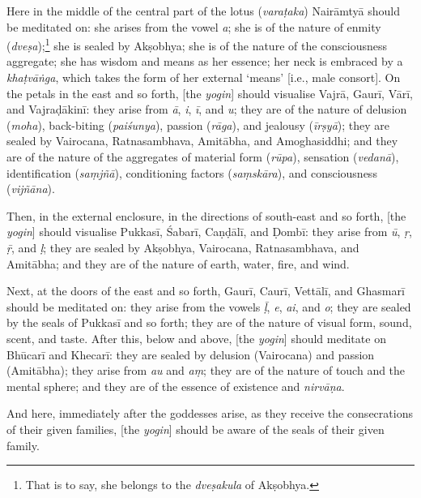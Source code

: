\documentclass[naipra.tex]{subfiles}
\begin{document}
Here in the middle of the central part of the lotus (\emph{varaṭaka}) Nairāmtyā should be meditated on: she arises from the vowel \emph{a}; she is of the nature of enmity (\emph{dveṣa});\footnote{
	That is to say, she belongs to the \emph{dveṣakula} of Akṣobhya.
} she is sealed by Akṣobhya; she is of the nature of the consciousness aggregate; she has wisdom and means as her essence; her neck is embraced by a \emph{khaṭvāṅga}, which takes the form of her external `means' [i.e., male consort].
On the petals in the east and so forth, [the \emph{yogin}] should visualise Vajrā, Gaurī, Vārī, and Vajraḍākinī: they arise from \emph{ā}, \emph{i}, \emph{ī}, and \emph{u}; they are of the nature of delusion (\emph{moha}), back-biting (\emph{paiśunya}), passion (\emph{rāga}), and jealousy (\emph{īrṣyā}); they are sealed by Vairocana, Ratnasambhava, Amitābha, and Amoghasiddhi; and they are of the nature of the aggregates of material form (\emph{rūpa}), sensation (\emph{vedanā}), identification (\emph{saṃjñā}), conditioning factors (\emph{saṃskāra}), and consciousness (\emph{vijñāna}).

Then, in the external enclosure, in the directions of south-east and so forth, [the \emph{yogin}] should visualise Pukkasī, Śabarī, Caṇḍālī, and Ḍombī: they arise from \emph{ū}, \emph{ṛ}, \emph{ṝ}, and \emph{ḷ}; they are sealed by Akṣobhya, Vairocana, Ratnasambhava, and Amitābha; and they are of the nature of earth, water, fire, and wind.

Next, at the doors of the east and so forth, Gaurī, Caurī, Vettālī, and Ghasmarī should be meditated on: they arise from the vowels \emph{ḹ}, \emph{e}, \emph{ai}, and \emph{o}; they are sealed by the seals of Pukkasī and so forth; they are of the nature of visual form, sound, scent, and taste.
After this, below and above, [the \emph{yogin}] should meditate on Bhūcarī and Khecarī: they are sealed by delusion (Vairocana) and passion (Amitābha); they arise from \emph{au} and \emph{aṃ}; they are of the nature of touch and the mental sphere; and they are of the essence of existence and \emph{nirvāṇa}.

And here, immediately after the goddesses arise, as they receive the consecrations of their given families, [the \emph{yogin}] should be aware of the seals of their given family. 
\end{document}
